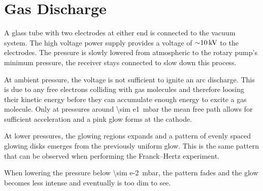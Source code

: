\chapter{Gas Discharge}

A glass tube with two electrodes at either end is connected to the vacuum system.
The high voltage power supply provides a voltage of $\SI{\sim10}{\kV}$ to the electrodes.
The pressure is slowly lowered from atmospheric to the rotary pump's minimum pressure, the receiver stays connected to slow down this process.

At ambient pressure, the voltage is not sufficient to ignite an arc discharge.
This is due to any free electrons colliding with gas molecules and therefore loosing their kinetic energy  before they can accumulate enough energy to excite a gas molecule.
Only at pressures around \SI{\sim e1}{\milli\bar} the mean free path allows for sufficient acceleration and a pink glow forms at the cathode.

At lower pressures, the glowing regions expands and a pattern of evenly spaced glowing disks emerges from the previously uniform glow.
This is the same pattern that can be observed when performing the Franck–Hertz experiment.

When lowering the pressure below \SI{\sim e-2}{\milli\bar}, the pattern fades and the glow becomes less intense and eventually is too dim to see.

